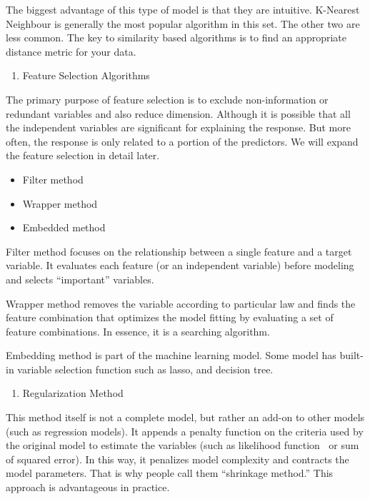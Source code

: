 \documentclass[]{book}
\providecommand{\tightlist}{%
  \setlength{\itemsep}{0pt}\setlength{\parskip}{0pt}}
\theoremstyle{definition}
\theoremstyle{definition}
\theoremstyle{remark}
\begin{document}
The biggest advantage of this type of model is that they are intuitive.
K-Nearest Neighbour is generally the most popular algorithm in this set.
The other two are less common. The key to similarity based algorithms is
to find an appropriate distance metric for your data.

\begin{enumerate}
\def\labelenumi{\arabic{enumi}.}
\setcounter{enumi}{2}
\tightlist
\item
  Feature Selection Algorithms
\end{enumerate}

The primary purpose of feature selection is to exclude non-information
or redundant variables and also reduce dimension. Although it is
possible that all the independent variables are significant for
explaining the response. But more often, the response is only related to
a portion of the predictors. We will expand the feature selection in
detail later.

\begin{itemize}
\tightlist
\item
  Filter method
\item
  Wrapper method
\item
  Embedded method
\end{itemize}

Filter method focuses on the relationship between a single feature and a
target variable. It evaluates each feature (or an independent variable)
before modeling and selects ``important'' variables.

Wrapper method removes the variable according to particular law and
finds the feature combination that optimizes the model fitting by
evaluating a set of feature combinations. In essence, it is a searching
algorithm.

Embedding method is part of the machine learning model. Some model has
built-in variable selection function such as lasso, and decision tree.

\begin{enumerate}
\def\labelenumi{\arabic{enumi}.}
\setcounter{enumi}{3}
\tightlist
\item
  Regularization Method
\end{enumerate}

This method itself is not a complete model, but rather an add-on to
other models (such as regression models). It appends a penalty function
on the criteria used by the original model to estimate the variables
(such as likelihood function or sum of squared error). In this way, it
penalizes model complexity and contracts the model parameters. That is
why people call them ``shrinkage method.'' This approach is advantageous
in practice.
\end{document}
